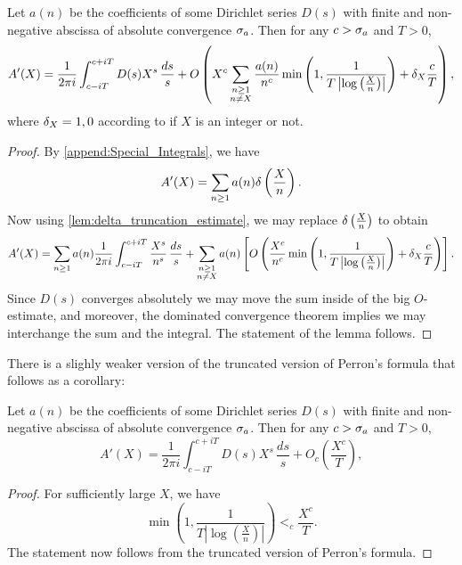       \begin{theorem}
        Let $a(n)$ be the coefficients of some Dirichlet series $D(s)$ with finite and non-negative abscissa of absolute convergence $\sigma_{a}$. Then for any $c > \sigma_{a}$ and $T > 0$,
        \[
          A'(X) = \frac{1}{2\pi i}\int_{c-iT}^{c+iT}D(s)X^{s}\,\frac{ds}{s}+O\left(X^{c}\sum_{\substack{n \ge 1 \\ n \neq X}}\frac{a(n)}{n^{c}}\min\left(1,\frac{1}{T\left|\log\left(\frac{X}{n}\right)\right|}\right)+\delta_{X}\frac{c}{T}\right),
        \]
        where $\delta_{X} = 1,0$ according to if $X$ is an integer or not.
      \end{theorem}
      \begin{proof}
        By \cref{append:Special_Integrals}, we have
        \[
          A'(X) = \sum_{n \ge 1}a(n)\delta\left(\frac{X}{n}\right).
        \]
        Now using \cref{lem:delta_truncation_estimate}, we may replace $\delta\left(\frac{X}{n}\right)$ to obtain
        \[
          A'(X) = \sum_{n \ge 1}a(n)\frac{1}{2\pi i}\int_{c-iT}^{c+iT}\frac{X^{s}}{n^{s}}\,\frac{ds}{s}+\sum_{\substack{n \ge 1 \\ n \neq X}}a(n)\left[O\left(\frac{X^{c}}{n^{c}}\min\left(1,\frac{1}{T\left|\log\left(\frac{X}{n}\right)\right|}\right)+\delta_{X}\frac{c}{T}\right)\right].
        \]
        Since $D(s)$ converges absolutely we may move the sum inside of the big $O$-estimate, and moreover, the dominated convergence theorem implies we may interchange the sum and the integral. The statement of the lemma follows.
      \end{proof}

      There is a slighly weaker version of the truncated version of Perron's formula that follows as a corollary:

      \begin{corollary}
        Let $a(n)$ be the coefficients of some Dirichlet series $D(s)$ with finite and non-negative abscissa of absolute convergence $\sigma_{a}$. Then for any $c > \sigma_{a}$ and $T > 0$,
        \[
          A'(X) = \frac{1}{2\pi i}\int_{c-iT}^{c+iT}D(s)X^{s}\,\frac{ds}{s}+O_{c}\left(\frac{X^{c}}{T}\right),
        \]
      \end{corollary}
      \begin{proof}
        For sufficiently large $X$, we have
        \[
          \min\left(1,\frac{1}{T\left|\log\left(\frac{X}{n}\right)\right|}\right) <_{c} \frac{X^{c}}{T}.
        \]
        The statement now follows from the truncated version of Perron's formula.
      \end{proof}

